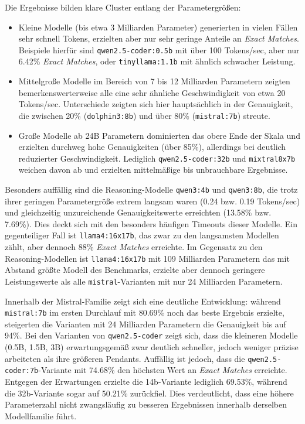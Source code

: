 Die Ergebnisse bilden klare Cluster entlang der Parametergrößen:
\begin{itemize}
    \item Kleine Modelle (bis etwa 3 Milliarden Parameter) generierten in vielen Fällen sehr schnell Tokens, erzielten aber nur sehr geringe Anteile an \textit{Exact Matches}. Beispiele hierfür sind \texttt{qwen2.5-coder:0.5b} mit über \num{100} Tokens/sec, aber nur \num{6.42}\% \textit{Exact Matches}, oder \texttt{tinyllama:1.1b} mit ähnlich schwacher Leistung.
    \item Mittelgroße Modelle im Bereich von 7 bis 12 Milliarden Parametern zeigten bemerkenswerterweise alle eine sehr ähnliche Geschwindigkeit von etwa \num{20} Tokens/sec. Unterschiede zeigten sich hier hauptsächlich in der Genauigkeit, die zwischen \num{20}\% (\texttt{dolphin3:8b}) und über \num{80}\% (\texttt{mistral:7b}) streute.
    \item Große Modelle ab 24B Parametern dominierten das obere Ende der Skala und erzielten durchweg hohe Genauigkeiten (über \num{85}\%), allerdings bei deutlich reduzierter Geschwindigkeit. Lediglich \texttt{qwen2.5-coder:32b} und \texttt{mixtral8x7b} weichen davon ab und erzielten mittelmäßige bis unbrauchbare Ergebnisse.
\end{itemize}

Besonders auffällig sind die Reasoning-Modelle \texttt{qwen3:4b} und \texttt{qwen3:8b}, die trotz ihrer geringen Parametergröße extrem langsam waren (\num{0.24} bzw. \num{0.19} Tokens/sec) und gleichzeitig unzureichende Genauigkeitswerte erreichten (\num{13.58}\% bzw. \num{7.69}\%). Dies deckt sich mit den besonders häufigen Timeouts dieser Modelle.
Ein gegenteiliger Fall ist \texttt{llama4:16x17b}, das zwar zu den langsamsten Modellen zählt, aber dennoch \num{88}\% \textit{Exact Matches} erreichte.
Im Gegensatz zu den Reasoning-Modellen ist \texttt{llama4:16x17b} mit 109 Milliarden Parametern das mit Abstand größte Modell des Benchmarks, erzielte aber dennoch geringere Leistungswerte als alle \texttt{mistral}-Varianten mit nur 24 Milliarden Parametern.

Innerhalb der Mistral-Familie zeigt sich eine deutliche Entwicklung: während \texttt{mistral:7b} im ersten Durchlauf mit \num{80.69}\% noch das beste Ergebnis erzielte, steigerten die Varianten mit 24 Milliarden Parametern die Genauigkeit bis auf \num{94}\%.
Bei den Varianten von \texttt{qwen2.5-coder} zeigt sich, dass die kleineren Modelle (0.5B, 1.5B, 3B) erwartungsgemäß zwar deutlich schneller, jedoch weniger präzise arbeiteten als ihre größeren Pendants.
Auffällig ist jedoch, dass die \texttt{qwen2.5-coder:7b}-Variante mit \num{74,68}\% den höchsten Wert an \textit{Exact Matches} erreichte.
Entgegen der Erwartungen erzielte die 14b-Variante lediglich \num{69,53}\%, während die 32b-Variante sogar auf \num{50,21}\% zurückfiel.
Dies verdeutlicht, dass eine höhere Parameterzahl nicht zwangsläufig zu besseren Ergebnissen innerhalb derselben Modellfamilie führt.

